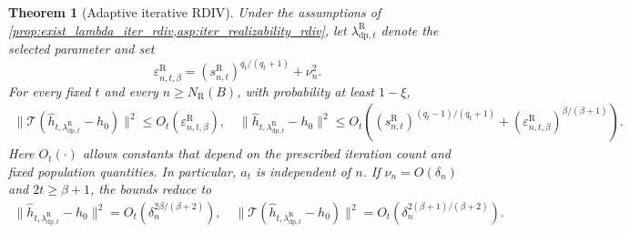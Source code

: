 \documentclass[12pt]{article}
\theoremstyle{plain}
\newtheorem{theorem}{Theorem}[section]
\theoremstyle{definition}
\theoremstyle{remark}
\begin{document}
\begin{theorem}[Adaptive iterative RDIV]\label{thm:iter_rdiv_rate}
Under the assumptions of
\cref{prop:exist_lambda_iter_rdiv,asp:iter_realizability_rdiv}, let
$\lambda_{\mathrm{dp},t}^{\mathrm R}$ denote the selected parameter and set
\[
\varepsilon_{n,t,\beta}^{\mathrm R} =(s_{n,t}^{\mathrm R})^{q_t/(q_t+1)}+\nu_n^2.
\]
For every fixed $t$ and every $n\geqslant N_{\mathrm R}(B)$, with probability at least $1-\xi$,
\begin{align*}
\|\mathcal T(\hat h_{t,\lambda_{\mathrm{dp},t}^{\mathrm R}}-h_0)\|^2
\leqslant O_t(\varepsilon_{n,t,\beta}^{\mathrm R}), \quad  \|\hat h_{t,\lambda_{\mathrm{dp},t}^{\mathrm R}}-h_0\|^2
\leqslant O_t\!\left(
(s_{n,t}^{\mathrm R})^{(q_t-1)/(q_t+1)}
+(\varepsilon_{n,t,\beta}^{\mathrm R})^{\beta/(\beta+1)}
\right).
\end{align*}
Here $O_t(\cdot)$ allows constants that depend on the prescribed iteration count and fixed population quantities. In particular, $a_t$ is independent of $n$. If $\nu_n=O(\delta_n)$ and $2t\geqslant\beta+1$, the bounds reduce to
\begin{align*}
\|\hat h_{t,\lambda_{\mathrm{dp},t}^{\mathrm R}}-h_0\|^2
=O_t\!\left(\delta_n^{2\beta/(\beta+2)}\right), \quad  \|\mathcal T(\hat h_{t,\lambda_{\mathrm{dp},t}^{\mathrm R}}-h_0)\|^2
=O_t\!\left(\delta_n^{2(\beta+1)/(\beta+2)}\right).
\end{align*}


\end{theorem}
\end{document}
